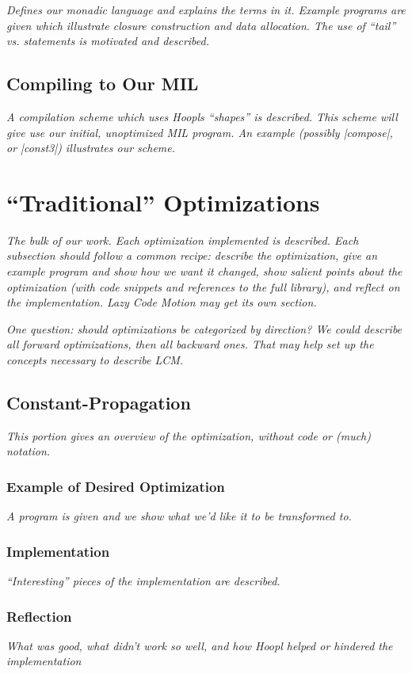 \documentclass[12pt]{report}
\begin{document}
\emph{Defines our monadic language and explains the terms in
  it. Example programs are given which illustrate closure construction
  and data allocation. The use of ``tail'' vs. statements is motivated
  and described. }

\section{Compiling to Our MIL}
\emph{A compilation scheme which uses Hoopls ``shapes'' is
described. This scheme will give use our initial, unoptimized
MIL program. An example (possibly |compose|, or |const3|) illustrates 
our scheme.}

\chapter{``Traditional'' Optimizations}

\emph{The bulk of our work. Each optimization implemented is
  described. Each subsection should follow a common recipe: describe
  the optimization, give an example program and show how we want it
  changed, show salient points about the optimization (with code
  snippets and references to the full library), and reflect on the
  implementation.  Lazy Code Motion may get its own section.}

\emph{One question: should optimizations be categorized by direction? We could
describe all forward optimizations, then all backward ones. That may help
set up the concepts necessary to describe LCM.}

\section{Constant-Propagation}
\emph{This portion gives an overview of the optimization, without
code or (much) notation.}

\subsection{Example of Desired Optimization}
\emph{A program is given and we show what we'd like it to be
transformed to.}

\subsection{Implementation}
\emph{``Interesting'' pieces of the implementation are described.}

\subsection{Reflection}
\emph{What was good, what didn't work so well, and how Hoopl helped
or hindered the implementation}
\end{document}
